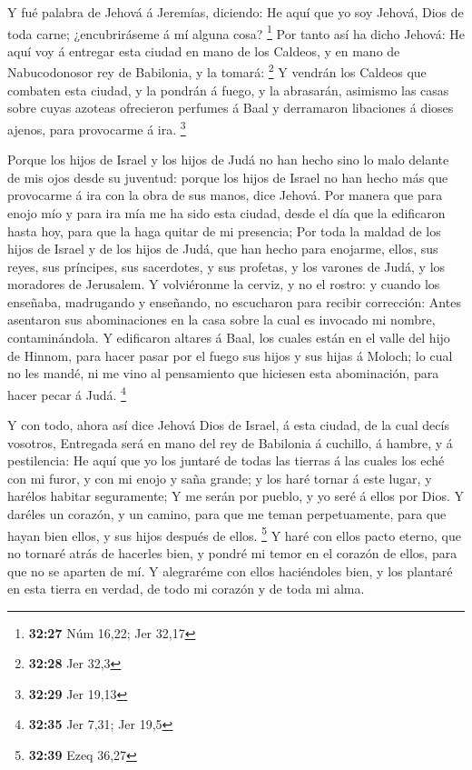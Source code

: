  Y fué palabra de Jehová á Jeremías, diciendo:
 He aquí que yo soy Jehová, Dios de toda carne;
¿encubriráseme á mí alguna cosa? \footnote{\textbf{32:27} Núm 16,22; Jer
  32,17}  Por tanto así ha dicho Jehová: He aquí voy á
entregar esta ciudad en mano de los Caldeos, y en mano de Nabucodonosor
rey de Babilonia, y la tomará: \footnote{\textbf{32:28} Jer 32,3}
 Y vendrán los Caldeos que combaten esta ciudad, y la
pondrán á fuego, y la abrasarán, asimismo las casas sobre cuyas azoteas
ofrecieron perfumes á Baal y derramaron libaciones á dioses ajenos, para
provocarme á ira. \footnote{\textbf{32:29} Jer 19,13}

 Porque los hijos de Israel y los hijos de Judá no han
hecho sino lo malo delante de mis ojos desde su juventud: porque los
hijos de Israel no han hecho más que provocarme á ira con la obra de sus
manos, dice Jehová.  Por manera que para enojo mío y para
ira mía me ha sido esta ciudad, desde el día que la edificaron hasta
hoy, para que la haga quitar de mi presencia;  Por toda la
maldad de los hijos de Israel y de los hijos de Judá, que han hecho para
enojarme, ellos, sus reyes, sus príncipes, sus sacerdotes, y sus
profetas, y los varones de Judá, y los moradores de Jerusalem.
 Y volviéronme la cerviz, y no el rostro: y cuando los
enseñaba, madrugando y enseñando, no escucharon para recibir corrección:
 Antes asentaron sus abominaciones en la casa sobre la cual
es invocado mi nombre, contaminándola.  Y edificaron
altares á Baal, los cuales están en el valle del hijo de Hinnom, para
hacer pasar por el fuego sus hijos y sus hijas á Moloch; lo cual no les
mandé, ni me vino al pensamiento que hiciesen esta abominación, para
hacer pecar á Judá. \footnote{\textbf{32:35} Jer 7,31; Jer 19,5}

 Y con todo, ahora así dice Jehová Dios de Israel, á esta
ciudad, de la cual decís vosotros, Entregada será en mano del rey de
Babilonia á cuchillo, á hambre, y á pestilencia:  He aquí
que yo los juntaré de todas las tierras á las cuales los eché con mi
furor, y con mi enojo y saña grande; y los haré tornar á este lugar, y
harélos habitar seguramente;  Y me serán por pueblo, y yo
seré á ellos por Dios.  Y daréles un corazón, y un camino,
para que me teman perpetuamente, para que hayan bien ellos, y sus hijos
después de ellos. \footnote{\textbf{32:39} Ezeq 36,27}  Y
haré con ellos pacto eterno, que no tornaré atrás de hacerles bien, y
pondré mi temor en el corazón de ellos, para que no se aparten de mí.
 Y alegraréme con ellos haciéndoles bien, y los plantaré en
esta tierra en verdad, de todo mi corazón y de toda mi alma.

